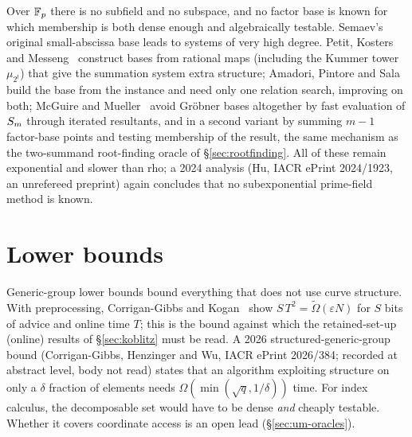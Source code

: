 Over $\mathbb{F}_p$ there is no subfield and no subspace, and no factor base is
known for which membership is both dense enough and algebraically testable.
Semaev's original small-abscissa base leads to systems of very high degree.
Petit, Kosters and Messeng~\cite{pkm2016} construct bases from rational maps
(including the Kummer tower $\mu_{2^t}$) that give the summation system
extra structure; Amadori, Pintore and Sala~\cite{aps2018} build the base
from the instance and need only one relation search, improving on both;
McGuire and Mueller~\cite{mcguire2017} avoid Gr\"obner bases altogether by
fast evaluation of $S_{m}$ through iterated resultants, and in a second
variant by summing $m-1$ factor-base points and testing membership of the
result, the same mechanism as the two-summand root-finding oracle of
\S\ref{sec:rootfinding}. All of these remain exponential and slower than
rho; a 2024 analysis (Hu, IACR ePrint 2024/1923, an unrefereed preprint)
again concludes that no subexponential prime-field method is known.

\section{Lower bounds}

Generic-group lower bounds bound everything that does not use curve
structure. With preprocessing, Corrigan-Gibbs and
Kogan~\cite{cgk2018} show $S\,T^2=\tilde\Omega(\varepsilon N)$ for $S$ bits
of advice and online time $T$; this is the bound against which the
retained-set-up (online) results of \S\ref{sec:koblitz} must be read. A
2026 structured-generic-group bound (Corrigan-Gibbs, Henzinger and Wu,
IACR ePrint 2026/384; recorded at abstract level, body not read) states
that an algorithm exploiting structure on only a $\delta$ fraction of
elements needs $\Omega(\min(\sqrt q,1/\delta))$ time. For index
calculus, the decomposable set would have to be dense \emph{and} cheaply
testable. Whether it covers coordinate access is an open lead
(\S\ref{sec:um-oracles}).
